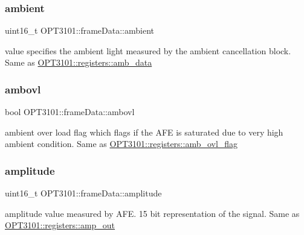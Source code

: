 \subsubsection{\texorpdfstring{ambient}{ambient}}
{\footnotesize\ttfamily uint16\+\_\+t O\+P\+T3101\+::frame\+Data\+::ambient}



value specifies the ambient light measured by the ambient cancellation block. Same as \mbox{\hyperlink{class_o_p_t3101_1_1registers_ae6b7c86e96cbfb1efe3263caed9de137}{O\+P\+T3101\+::registers\+::amb\+\_\+data}} 

\mbox{\label{class_o_p_t3101_1_1frame_data_ac3c39e0f87987858d5db6291c6b6d4fa}} 
\subsubsection{\texorpdfstring{ambovl}{ambovl}}
{\footnotesize\ttfamily bool O\+P\+T3101\+::frame\+Data\+::ambovl}



ambient over load flag which flags if the A\+FE is saturated due to very high ambient condition. Same as \mbox{\hyperlink{class_o_p_t3101_1_1registers_a5ba6f5ef459327f64179b6d405dbd101}{O\+P\+T3101\+::registers\+::amb\+\_\+ovl\+\_\+flag}} 

\mbox{\label{class_o_p_t3101_1_1frame_data_a16b903f0cea13dc66d751beab7271a18}} 
\subsubsection{\texorpdfstring{amplitude}{amplitude}}
{\footnotesize\ttfamily uint16\+\_\+t O\+P\+T3101\+::frame\+Data\+::amplitude}



amplitude value measured by A\+FE. 15 bit representation of the signal. Same as \mbox{\hyperlink{class_o_p_t3101_1_1registers_a09663efd977de72bdf7820e0a8f92390}{O\+P\+T3101\+::registers\+::amp\+\_\+out}} 

\mbox{\label{class_o_p_t3101_1_1frame_data_ab29ea3b01c14d5fab239039a61ca4594}} 
